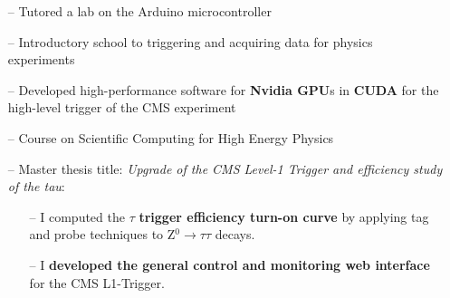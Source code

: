 \documentclass[10pt,a4paper]{altacv}
\begin{document}

\begin{itemize}
    \setlength{\itemindent}{0.5em}
    \item[--]   \small{Tutored a lab on the Arduino microcontroller}
\end{itemize}

\medskip


\begin{itemize}
    \setlength{\itemindent}{0.5em}
    \item[--]   \small{Introductory school to triggering and acquiring data for physics experiments}
\end{itemize}

\medskip


\begin{itemize}
    \setlength{\itemindent}{0.5em}
    \item[--]   \small{Developed high-performance software for \textbf{Nvidia GPU}s in \textbf{CUDA} for the high-level trigger of the CMS experiment}
\end{itemize}

\medskip


\begin{itemize}
    \setlength{\itemindent}{0.5em}
    \item[--]   \small{Course on Scientific Computing for High Energy Physics}
\end{itemize}

\medskip


\begin{itemize}
    \setlength{\itemindent}{0.5em}
    \item[--]   \small{Master thesis title: \textit{Upgrade of the CMS Level-1 Trigger and efficiency study of the tau}}:
    \begin{itemize}
    \item[--]   \small{I computed the $\tau$ \textbf{trigger efficiency turn-on curve} by applying tag and probe techniques to Z$^0\to\tau\tau$ decays. }
    \item[--]   \small{I \textbf{developed the general control and monitoring web interface} for the CMS L1-Trigger. }
    \end{itemize}
\end{itemize}
\end{document}
